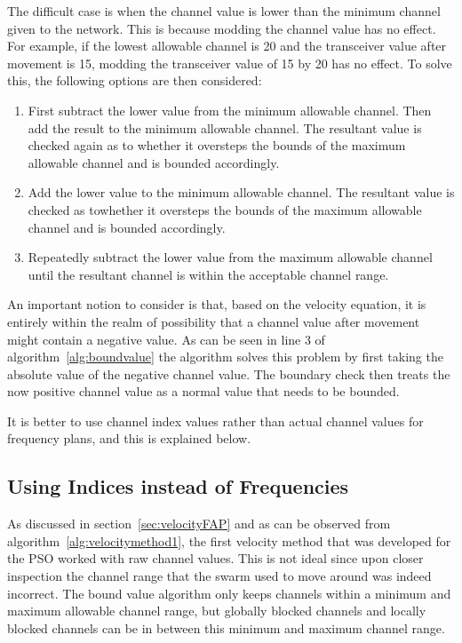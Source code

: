 The difficult case is when the channel value is lower than the minimum channel given to the network. This is because modding the channel value has no effect. For example, if the lowest allowable channel is 20 and the transceiver value after movement is 15, modding the transceiver value of 15 by 20 has no effect. To solve this, the following options are then considered:

\begin{enumerate}
\item First subtract the lower value from the minimum allowable channel. Then add the result to the minimum allowable channel. The resultant value is checked again as to whether it oversteps the bounds of the maximum allowable channel and is bounded accordingly.
\item Add the lower value to the minimum allowable channel. The resultant value is checked as towhether it oversteps the bounds of the maximum allowable channel and is bounded accordingly.
\item Repeatedly subtract the lower value from the maximum allowable channel until the resultant channel is within the acceptable channel range.
\end{enumerate}

An important notion to consider is that, based on the velocity equation, it is entirely within the realm of possibility that a channel value after movement might contain a negative value. As can be seen in line 3 of algorithm~\ref{alg:boundvalue} the algorithm solves this problem by first taking the absolute value of the negative channel value. The boundary check then treats the now positive channel value as a normal value that needs to be bounded.

It is better to use channel index values rather than actual channel values for frequency plans, and this is explained below.
\subsection{Using Indices instead of Frequencies}
\label{sec:velocityFAP2}
As discussed in section~\ref{sec:velocityFAP} and as can be observed from algorithm~\ref{alg:velocitymethod1}, the first velocity method that was developed for the PSO worked with raw channel values. This is not ideal since upon closer inspection the channel range that the swarm used to move around was indeed incorrect. The bound value algorithm only keeps channels within a minimum and maximum allowable channel range, but globally blocked channels and locally blocked channels can be in between this minimum and maximum channel range. 

